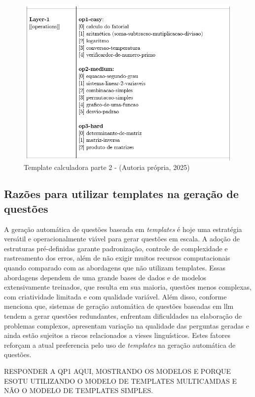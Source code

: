 \begin{figure}
    \centering
    \includegraphics[width=12cm]{./imagens/capitulo4/template-2.png}
    \caption{Template calculadora parte 2 - (Autoria própria, 2025)}
    \label{fig:template-2}
\end{figure}


\subsection{Razões para utilizar templates na geração de questões}

A geração automática de questões baseada em \textit{templates} é hoje uma estratégia versátil e operacionalmente viável para gerar questões em escala. A adoção de estruturas pré-definidas garante padronização, controle de complexidade e rastreamento dos erros, além de não exigir muitos recursos computacionais quando comparado com  as abordagens que não utilizam templates. Essas abordagens dependem de uma grande bases de dados e de modelos extensivamente treinados, que resulta em sua maioria, questões menos complexas, com criatividade limitada e com qualidade variável. Além disso, conforme \parencite{maity2024} menciona que, sistemas de geração automática de questões  baseadas em \gls{llm} tendem a gerar questões redundantes, enfrentam dificuldades na elaboração de problemas complexos, apresentam variação na qualidade das perguntas geradas e ainda estão sujeitos a riscos relacionados a vieses linguísticos. Estes fatores reforçam a atual preferencia pelo uso de \textit{templates} na geração automática de questões.


RESPONDER A QP1 AQUI, MOSTRANDO OS MODELOS E PORQUE ESOTU UTILIZANDO O MODELO DE TEMPLATES MULTICAMDAS E NÃO O MODELO DE TEMPLATES SIMPLES.